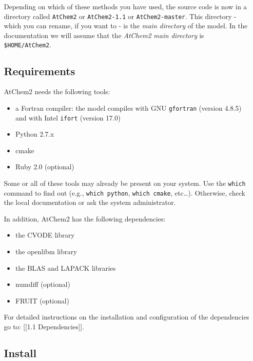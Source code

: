 Depending on which of these methods you have used, the source code is
now in a directory called \texttt{AtChem2} or \texttt{AtChem2-1.1} or
\texttt{AtChem2-master}. This directory - which you can rename, if you
want to - is the \emph{main directory} of the model. In the
documentation we will assume that the \emph{AtChem2 main directory} is
\texttt{\$HOME/AtChem2}.

\hypertarget{requirements}{%
\subsection{Requirements}\label{requirements}}

AtChem2 needs the following tools:

\begin{itemize}
\tightlist
\item
  a Fortran compiler: the model compiles with GNU \texttt{gfortran}
  (version 4.8.5) and with Intel \texttt{ifort} (version 17.0)
\item
  Python 2.7.x
\item
  cmake
\item
  Ruby 2.0 (optional)
\end{itemize}

Some or all of these tools may already be present on your system. Use
the \texttt{which} command to find out (e.g., \texttt{which\ python},
\texttt{which\ cmake}, etc\ldots{}). Otherwise, check the local
documentation or ask the system administrator.

In addition, AtChem2 has the following dependencies:

\begin{itemize}
\tightlist
\item
  the CVODE library
\item
  the openlibm library
\item
  the BLAS and LAPACK libraries
\item
  numdiff (optional)
\item
  FRUIT (optional)
\end{itemize}

For detailed instructions on the installation and configuration of the
dependencies go to: {[}{[}1.1 Dependencies{]}{]}.

\hypertarget{install}{%
\subsection{Install}\label{install}}

